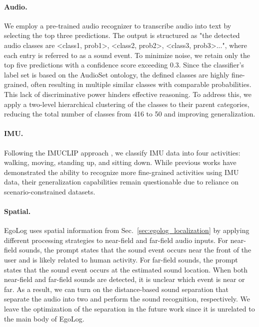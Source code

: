 \paragraph{Audio.} 
We employ a pre-trained audio recognizer \citep{schmid2023efficient} to transcribe audio into text by selecting the top three predictions. The output is structured as "the detected audio classes are <class1, prob1>, <class2, prob2>, <class3, prob3>...", where each entry is referred to as a sound event. To minimize noise, we retain only the top five predictions with a confidence score exceeding 0.3.
Since the classifier's label set is based on the AudioSet ontology, the defined classes are highly fine-grained, often resulting in multiple similar classes with comparable probabilities. This lack of discriminative power hinders effective reasoning. To address this, we apply a two-level hierarchical clustering of the classes to their parent categories, reducing the total number of classes from 416 to 50 and improving generalization.

\paragraph{IMU.} 
Following the IMUCLIP approach \citep{moon2023imu2clip}, we classify IMU data into four activities: walking, moving, standing up, and sitting down. While previous works have demonstrated the ability to recognize more fine-grained activities using IMU data, their generalization capabilities remain questionable due to reliance on scenario-constrained datasets.

\paragraph{Spatial.}
EgoLog uses spatial information from Sec.~\ref{sec:egolog_localization} by applying different processing strategies to near-field and far-field audio inputs. For near-field sounds, the prompt states that the sound event occurs near the front of the user and is likely related to human activity. For far-field sounds, the prompt states that the sound event occurs at the estimated sound location.
When both near-field and far-field sounds are detected, it is unclear which event is near or far. As a result, we can turn on the distance-based sound separation \citep{chen2024hearable} that separate the audio into two and perform the sound recognition, respectively. We leave the optimization of the separation in the future work since it is unrelated to the main body of EgoLog.




